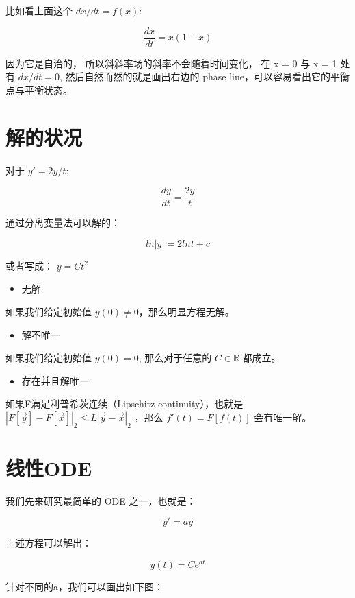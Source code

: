 \documentclass[
]{book}
\providecommand{\tightlist}{%
  \setlength{\itemsep}{0pt}\setlength{\parskip}{0pt}}
\begin{document}
比如看上面这个 \(dx/dt = f(x)\):

\[
\frac{dx}{dt} = x(1-x)
\]

因为它是自治的， 所以斜斜率场的斜率不会随着时间变化， 在 x = 0 与 x = 1 处 有 \(dx/dt = 0\), 然后自然而然的就是画出右边的 phase line，可以容易看出它的平衡点与平衡状态。

\hypertarget{ux89e3ux7684ux72b6ux51b5}{%
\section{解的状况}\label{ux89e3ux7684ux72b6ux51b5}}

对于 \(y' = 2y/t\):

\[
\frac{dy}{dt} = \frac{2y}{t}
\]

通过分离变量法可以解的：

\[
ln |y| = 2 ln t + c
\]

或者写成： \(y = Ct^2\)

\begin{itemize}
\tightlist
\item
  无解
\end{itemize}

如果我们给定初始值 \(y(0) \ne 0\)，那么明显方程无解。

\begin{itemize}
\tightlist
\item
  解不唯一
\end{itemize}

如果我们给定初始值 \(y(0) = 0\), 那么对于任意的 \(C \in \mathbb{R}\) 都成立。

\begin{itemize}
\tightlist
\item
  存在并且解唯一
\end{itemize}

如果F满足利普希茨连续（Lipschitz continuity），也就是 \(|F[\vec{y}]-F[\vec{x}]|_2 \leq L|\vec{y}-\vec{x}|_2\) ，那么 \(f'(t) = F[f(t)]\) 会有唯一解。

\hypertarget{ux7ebfux6027ode}{%
\section{线性ODE}\label{ux7ebfux6027ode}}

我们先来研究最简单的 ODE 之一，也就是：

\[
y' = ay
\]

上述方程可以解出：

\[
y(t) = Ce^{at}
\]

针对不同的a，我们可以画出如下图：
\end{document}
